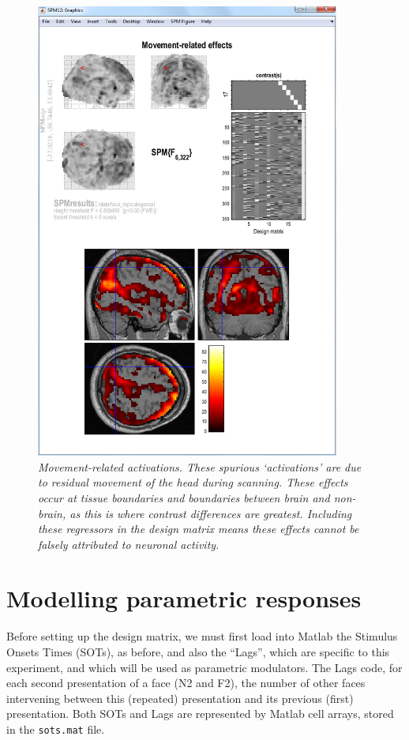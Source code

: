 \begin{figure}
\begin{center}
\includegraphics[width=100mm]{faces/movements}
\caption{\em Movement-related activations. These spurious `activations' are due to residual movement of the head during scanning. These effects occur at tissue boundaries and boundaries between brain and non-brain, as this is where contrast differences are greatest. Including these regressors in the design matrix means these effects cannot be falsely attributed 
to neuronal activity. \label{movements} }
\end{center}
\end{figure}


\section{Modelling parametric responses}


Before setting up the design matrix, we must first 
load into Matlab the Stimulus Onsets Times (SOTs), as before, and also the ``Lags'', which are specific to this experiment, and which will be used as parametric modulators. The Lags code, for each second presentation of a face (N2 and F2), the number of other faces intervening between this (repeated) presentation and its previous (first) presentation. Both SOTs and Lags are represented by Matlab cell arrays, stored in the \verb!sots.mat! file.


